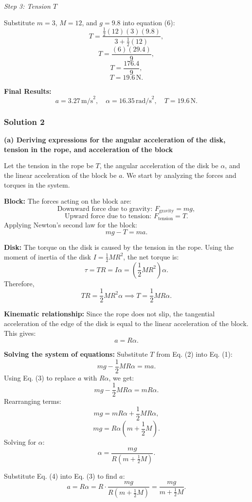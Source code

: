 \documentclass{article}
\begin{document}
\textit{Step 3: Tension $T$}

Substitute $m = 3$, $M = 12$, and $g = 9.8$ into equation (6):
\[
T = \frac{\frac{1}{2}(12)(3)(9.8)}{3 + \frac{1}{2}(12)},
\]
\[
T = \frac{(6)(29.4)}{9},
\]
\[
T = \frac{176.4}{9},
\]
\[
T = 19.6\,\text{N}.
\]

\textbf{Final Results:}
\[
a = 3.27\,\text{m/s}^2, \quad \alpha = 16.35\,\text{rad/s}^2, \quad T = 19.6\,\text{N}.
\]

\subsubsection{Solution 2}
\textbf{(a) Deriving expressions for the angular acceleration of the disk, tension in the rope, and acceleration of the block}

Let the tension in the rope be $T$, the angular acceleration of the disk be $\alpha$, and the linear acceleration of the block be $a$. We start by analyzing the forces and torques in the system.

\textbf{Block:}
The forces acting on the block are:
\[
\text{Downward force due to gravity: } F_{\text{gravity}} = mg,
\]
\[
\text{Upward force due to tension: } F_{\text{tension}} = T.
\]
Applying Newton's second law for the block:
\[
mg - T = ma \tag{1}.
\]

\textbf{Disk:}
The torque on the disk is caused by the tension in the rope. Using the moment of inertia of the disk $I = \frac{1}{2} M R^2$, the net torque is:
\[
\tau = T R = I \alpha = \left(\frac{1}{2} M R^2\right) \alpha. 
\]
Therefore,
\[
T R = \frac{1}{2} M R^2 \alpha \implies T = \frac{1}{2} M R \alpha \tag{2}.
\]

\textbf{Kinematic relationship:}
Since the rope does not slip, the tangential acceleration of the edge of the disk is equal to the linear acceleration of the block. This gives:
\[
a = R \alpha \tag{3}.
\]

\textbf{Solving the system of equations:}
Substitute $T$ from Eq. (2) into Eq. (1):
\[
mg - \frac{1}{2} M R \alpha = ma.
\]
Using Eq. (3) to replace $a$ with $R \alpha$, we get:
\[
mg - \frac{1}{2} M R \alpha = m R \alpha.
\]
Rearranging terms:
\[
mg = m R \alpha + \frac{1}{2} M R \alpha,
\]
\[
mg = R \alpha \left(m + \frac{1}{2} M\right).
\]
Solving for $\alpha$:
\[
\alpha = \frac{mg}{R \left(m + \frac{1}{2} M\right)} \tag{4}.
\]

Substitute Eq. (4) into Eq. (3) to find $a$:
\[
a = R \alpha = R \cdot \frac{mg}{R \left(m + \frac{1}{2} M\right)} = \frac{mg}{m + \frac{1}{2} M} \tag{5}.
\]
\end{document}
